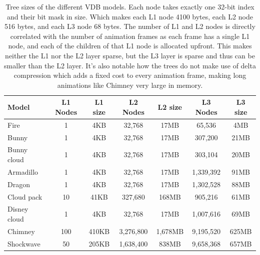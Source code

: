 \begin{table}[htbp]
    \centering
    \begin{tabularx}{\textwidth}{|X|c|c|c|c|c|c|}
    \hline
    \textbf{Model} & \textbf{L1 Nodes} & \textbf{L1 size} & \textbf{L2 Nodes} & \textbf{L2 size} & \textbf{L3 Nodes} & \textbf{L3 size} \\
    \hline
    Fire & 1 & 4KB & 32,768 & 17MB & 65,536 & 4MB\\
    \hline
    Bunny & 1 & 4KB & 32,768 & 17MB & 307,200 & 21MB\\
    \hline
    Bunny cloud & 1 & 4KB & 32,768 & 17MB & 303,104 & 20MB\\
    \hline
    Armadillo & 1 & 4KB & 32,768 & 17MB & 1,339,392 & 91MB\\
    \hline
    Dragon & 1 & 4KB & 32,768 & 17MB & 1,302,528 & 88MB\\
    \hline
    Cloud pack & 10 & 41KB & 327,680 & 168MB & 905,216 & 61MB\\
    \hline
    Disney cloud & 1 & 4KB & 32,768 & 17MB & 1,007,616 & 69MB\\
    \hline
    Chimney & 100 & 410KB & 3,276,800 & 1,678MB & 9,195,520 & 625MB\\
    \hline
    Shockwave & 50 & 205KB & 1,638,400 & 838MB & 9,658,368 & 657MB\\
    \hline
    \end{tabularx}
    \caption{Tree sizes of the different VDB models. Each node takes exactly one 32-bit index and their bit mask in size. Which makes each L1 node 4100 bytes, each L2 node 516 bytes, and each L3 node 68 bytes. The number of L1 and L2 nodes is directly correlated with the number of animation frames as each frame has a single L1 node, and each of the children of that L1 node is allocated upfront. This makes neither the L1 nor the L2 layer sparse, but the L3 layer is sparse and thus can be smaller than the L2 layer. It's also notable how the trees do not make use of delta compression which adds a fixed cost to every animation frame, making long animations like Chimney very large in memory.}
    \label{tab:tree_sizes}
\end{table}

